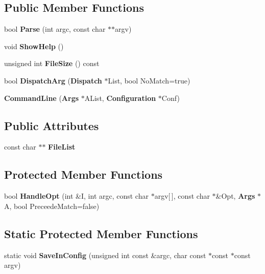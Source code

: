 \subsection*{\-Public \-Member \-Functions}
\begin{DoxyCompactItemize}
\item 
bool {\bfseries \-Parse} (int argc, const char $\ast$$\ast$argv)\label{classCommandLine_a126fb7c56c821d027a99fb1ae87d9684}

\item 
void {\bfseries \-Show\-Help} ()\label{classCommandLine_ab180efaa64feefae6244d2c4b4eb7809}

\item 
unsigned int {\bfseries \-File\-Size} () const \label{classCommandLine_a72f44663ac6637bcec9a68eefb4f200a}

\item 
bool {\bfseries \-Dispatch\-Arg} ({\bf \-Dispatch} $\ast$\-List, bool \-No\-Match=true)\label{classCommandLine_a9d8af7a43d9909e23d48528f9cf4f00e}

\item 
{\bfseries \-Command\-Line} ({\bf \-Args} $\ast$\-A\-List, {\bf \-Configuration} $\ast$\-Conf)\label{classCommandLine_adde3c1db729b33fd853f7323181fe26c}

\end{DoxyCompactItemize}
\subsection*{\-Public \-Attributes}
\begin{DoxyCompactItemize}
\item 
const char $\ast$$\ast$ {\bfseries \-File\-List}\label{classCommandLine_a006171d2d73c40a3e756a94bc6ae491b}

\end{DoxyCompactItemize}
\subsection*{\-Protected \-Member \-Functions}
\begin{DoxyCompactItemize}
\item 
bool {\bfseries \-Handle\-Opt} (int \&\-I, int argc, const char $\ast$argv[$\,$], const char $\ast$\&\-Opt, {\bf \-Args} $\ast$\-A, bool \-Preceede\-Match=false)\label{classCommandLine_af155ad04a75d5eaac1d4c4d78c3ca35e}

\end{DoxyCompactItemize}
\subsection*{\-Static \-Protected \-Member \-Functions}
\begin{DoxyCompactItemize}
\item 
static void {\bfseries \-Save\-In\-Config} (unsigned int const \&argc, char const $\ast$const $\ast$const argv)\label{classCommandLine_a62f4c88a6fc106c1575dd38f5715084a}

\end{DoxyCompactItemize}
